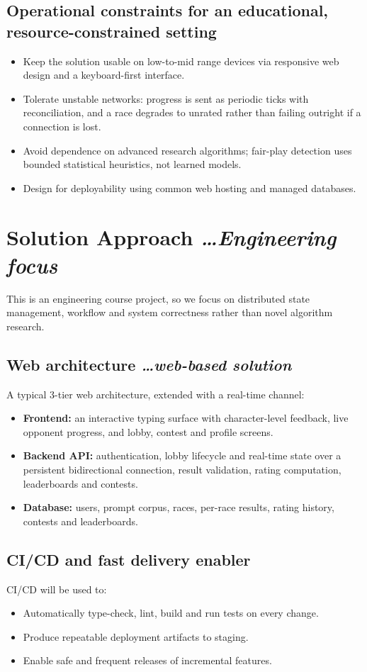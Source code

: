\documentclass[11pt,a4paper]{article}
\newcommand{\BvrHint}[1]{%
  {\normalfont\normalsize\itshape\hfill #1}}
\begin{document}
\subsection{Operational constraints for an educational, resource-constrained setting}
\begin{itemize}[leftmargin=0.7cm]
    \item Keep the solution usable on low-to-mid range devices via responsive web design and a keyboard-first interface.
    \item Tolerate unstable networks: progress is sent as periodic ticks with reconciliation, and a race degrades to unrated rather than failing outright if a connection is lost.
    \item Avoid dependence on advanced research algorithms; fair-play detection uses bounded statistical heuristics, not learned models.
    \item Design for deployability using common web hosting and managed databases.
\end{itemize}

\section{Solution Approach %
\BvrHint{\ldots Engineering focus}}
This is an engineering course project, so we focus on
distributed state management, workflow and system correctness
rather than novel algorithm research.

\subsection{Web architecture %
\BvrHint{\ldots web-based solution}}
A typical 3-tier web architecture, extended with a real-time channel:
\begin{itemize}[leftmargin=0.7cm]
    \item \textbf{Frontend:} an interactive typing surface with character-level feedback, live opponent progress, and lobby, contest and profile screens.
    \item \textbf{Backend API:} authentication, lobby lifecycle and real-time state over a persistent bidirectional connection, result validation, rating computation, leaderboards and contests.
    \item \textbf{Database:} users, prompt corpus, races, per-race results, rating history, contests and leaderboards.
\end{itemize}

\subsection{CI/CD and fast delivery enabler}
CI/CD will be used to:
\begin{itemize}[leftmargin=0.7cm]
    \item Automatically type-check, lint, build and run tests on every change.
    \item Produce repeatable deployment artifacts to staging.
    \item Enable safe and frequent releases of incremental features.
\end{itemize}
\end{document}
